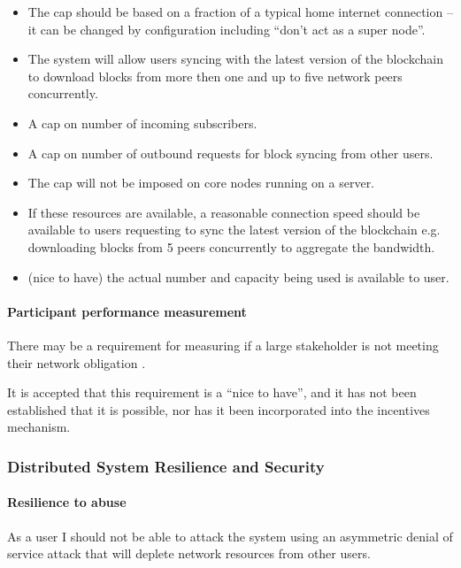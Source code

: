 \begin{itemize}
\item The cap should be based on a fraction of a typical home internet
      connection -- it can be changed by configuration including ``don't act
      as a super node''.
\item The system will allow users syncing with the latest version of the
      blockchain to download blocks from more then one and up to five network
      peers concurrently.
\item A cap on number of incoming subscribers.
\item A cap on number of outbound requests for block syncing from other users.
\item The cap will not be imposed on core nodes running on a server.
\item If these resources are available, a reasonable connection speed should be
      available to users requesting to sync the latest version of the
      blockchain e.g. downloading blocks from 5 peers concurrently to aggregate
      the bandwidth.
\item (nice to have) the actual number and capacity being used is available to
      user.
\end{itemize}

\paragraph{Participant performance measurement}

There may be a requirement for measuring if a large stakeholder is not meeting
their network obligation \cite{DBLP:journals/corr/abs-1807-11218}.

It is accepted that this requirement is a ``nice to have'', and it has not been
established that it is possible, nor has it been incorporated into the
incentives mechanism.

\subsubsection{Distributed System Resilience and Security}

\paragraph{Resilience to abuse}

As a user I should not be able to attack the system using an asymmetric denial
of service attack that will deplete network resources from other users.

